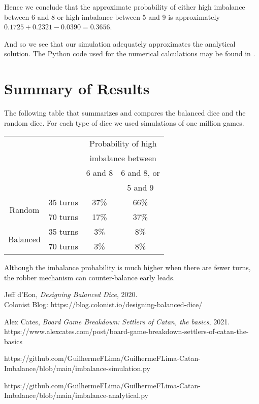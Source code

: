 \documentclass[11pt]{article}
\begin{document}
Hence we conclude that the approximate probability of either high imbalance between 6 and 8 or high imbalance between 5 and 9 is approximately $0.1725 + 0.2321 - 0.0390 = 0.3656$.

And so we see that our simulation adequately approximates the analytical solution. The Python code used for the numerical calculations may be found in \cite{githubsim}.

\section{Summary of Results}
The following table that summarizes and compares the balanced dice and the random dice. For each type of dice we used simulations of one million games.

\begin{center}
\vspace{1cm}

	\begin{tabular}{cc|c|c|}
\cline{3-4}
&& \multicolumn{2}{|c|}{Probability of high} \\
&& \multicolumn{2}{|c|}{imbalance between} \\
\cline{3-4}
&& 6 and 8 & 6 and 8, or \\
&& & 5 and 9 \\
\hline
\multicolumn{1}{|c}{\multirow{2}{*}{Random}} & 
\multicolumn{1}{|c|}{35 turns} & 37\% & 66\% \\
\cline{2-4}
\multicolumn{1}{|c}{\multirow{2}{*}{}} 
& \multicolumn{1}{|c|}{70 turns} & 17\% & 37\% \\
\hline
\multicolumn{1}{|c}{\multirow{2}{*}{Balanced}} & 
\multicolumn{1}{|c|}{35 turns} & 3\% & 8\% \\
\cline{2-4} 
\multicolumn{1}{|c}{\multirow{2}{*}{}} 
& \multicolumn{1}{|c|}{70 turns} & 3\% & 8\% \\
\hline
\end{tabular}
\end{center}
Although the imbalance probability is much higher when there are fewer turns, the robber mechanism can counter-balance early leads.


\begin{thebibliography}{9}

  Jeff d'Eon, \textit{Designing Balanced Dice}, 2020.\\
  Colonist Blog:
  https://blog.colonist.io/designing-balanced-dice/
 
 Alex Cates, \textit{Board Game Breakdown: Settlers of Catan, the basics}, 2021. \\
 https://www.alexcates.com/post/board-game-breakdown-settlers-of-catan-the-basics

https://github.com/GuilhermeFLima/GuilhermeFLima-Catan-Imbalance/blob/main/imbalance-simulation.py

https://github.com/GuilhermeFLima/GuilhermeFLima-Catan-Imbalance/blob/main/imbalance-analytical.py


\end{thebibliography}
\end{document}
